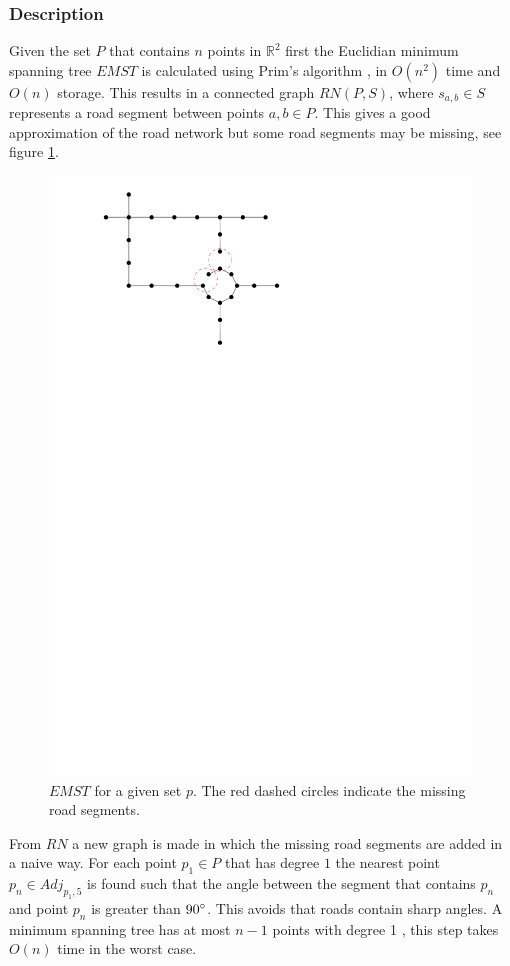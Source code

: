 \documentclass[11pt]{article}
\begin{document}
\subsubsection{Description}
Given the set $P$ that contains $n$ points in $\mathbb{R}^2$ first the Euclidian minimum spanning tree $EMST$ is calculated using Prim's algorithm \cite{p-scnsg-57}, in $O(n^2)$ time and $O(n)$ storage. This results in a connected graph $RN(P,S)$, where $s_{a,b}\in S$ represents a road segment between points $a,b \in P$. This gives a good approximation of the road network but some road segments may be missing, see figure \ref{emst}.

\begin{figure}[h]
  \centering
      \graphicspath{ {images/}}
      \includegraphics[width=0.5\linewidth]{NetworkMST}
      \caption{$EMST$ for a given set $p$. The red dashed circles indicate the missing road segments.}
      \label{emst}
  \end{figure}

From $RN$ a new graph is made in which the missing road segments are added in a naive way. For each point $p_1 \in P$ that has degree $1$ the nearest point $p_n \in Adj_{p_1,5}$ is found such that the angle between the segment that contains $p_n$ and point $p_n$ is greater than $90\degree$. This avoids that roads contain sharp angles. A minimum spanning tree has at most $n-1$ points with degree 1 \cite{clrs-ia-09}, this step takes $O(n)$ time in the worst case.
\end{document}
